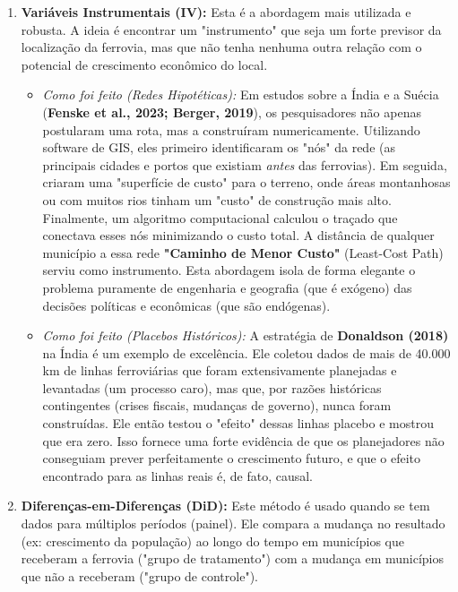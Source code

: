 \documentclass[12pt, a4paper]{article}
\begin{document}
\begin{enumerate}[label=\arabic*.]
    \item \textbf{Variáveis Instrumentais (IV):} Esta é a abordagem mais utilizada e robusta. A ideia é encontrar um "instrumento" que seja um forte previsor da localização da ferrovia, mas que não tenha nenhuma outra relação com o potencial de crescimento econômico do local.
    
    \begin{itemize}
        \item \textit{Como foi feito (Redes Hipotéticas):} Em estudos sobre a Índia e a Suécia (\textbf{Fenske et al., 2023; Berger, 2019}), os pesquisadores não apenas postularam uma rota, mas a construíram numericamente. Utilizando software de GIS, eles primeiro identificaram os "nós" da rede (as principais cidades e portos que existiam \textit{antes} das ferrovias). Em seguida, criaram uma "superfície de custo" para o terreno, onde áreas montanhosas ou com muitos rios tinham um "custo" de construção mais alto. Finalmente, um algoritmo computacional calculou o traçado que conectava esses nós minimizando o custo total. A distância de qualquer município a essa rede \textbf{"Caminho de Menor Custo"} (Least-Cost Path) serviu como instrumento. Esta abordagem isola de forma elegante o problema puramente de engenharia e geografia (que é exógeno) das decisões políticas e econômicas (que são endógenas).

        \item \textit{Como foi feito (Placebos Históricos):} A estratégia de \textbf{Donaldson (2018)} na Índia é um exemplo de excelência. Ele coletou dados de mais de 40.000 km de linhas ferroviárias que foram extensivamente planejadas e levantadas (um processo caro), mas que, por razões históricas contingentes (crises fiscais, mudanças de governo), nunca foram construídas. Ele então testou o "efeito" dessas linhas placebo e mostrou que era zero. Isso fornece uma forte evidência de que os planejadores não conseguiam prever perfeitamente o crescimento futuro, e que o efeito encontrado para as linhas reais é, de fato, causal.
    \end{itemize}

    \item \textbf{Diferenças-em-Diferenças (DiD):} Este método é usado quando se tem dados para múltiplos períodos (painel). Ele compara a mudança no resultado (ex: crescimento da população) ao longo do tempo em municípios que receberam a ferrovia ("grupo de tratamento") com a mudança em municípios que não a receberam ("grupo de controle").
    

\end{enumerate}
\end{document}

